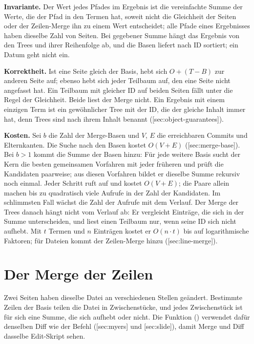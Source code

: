 {\bf Invariante.} Der Wert jedes Pfades im Ergebnis ist die vereinfachte Summe der Werte, die der
Pfad in den Termen hat, soweit nicht die Gleichheit der Seiten oder der Zeilen-Merge ihn zu
einem Wert entscheidet; alle Pfade eines Ergebnisses haben dieselbe Zahl von Seiten.
Bei gegebener Summe hängt das Ergebnis von den Trees und ihrer Reihenfolge ab, und die Basen
liefert  nach ID sortiert; ein Datum geht nicht ein.

{\bf Korrektheit.} Ist eine Seite gleich der Basis, hebt sich $O + (T - B)$ zur anderen Seite auf;
ebenso hebt sich jeder Teilbaum auf, den eine Seite nicht angefasst hat.
Ein Teilbaum mit gleicher ID auf beiden Seiten fällt unter die Regel der Gleichheit.
Beide liest der Merge nicht.
Ein Ergebnis mit einem einzigen Term ist ein gewöhnlicher Tree mit der ID, die der gleiche
Inhalt immer hat, denn Trees sind nach ihrem Inhalt benannt ([sec:object-guarantees]).

{\bf Kosten.} Sei $b$ die Zahl der Merge-Basen und $V$, $E$ die erreichbaren Commits und
Elternkanten.
Die Suche nach den Basen kostet $O(V+E)$ ([sec:merge-base]).
Bei $b > 1$ kommt die Summe der Basen hinzu: Für jede weitere Basis sucht der Kern die besten
gemeinsamen Vorfahren mit jeder früheren und prüft die Kandidaten paarweise;
aus diesen Vorfahren bildet er dieselbe Summe rekursiv noch einmal.
Jeder Schritt ruft  auf und kostet $O(V+E)$; die Paare allein machen bis zu
quadratisch viele Aufrufe in der Zahl der Kandidaten.
Im schlimmsten Fall wächst die Zahl der Aufrufe mit dem Verlauf.
Der Merge der Trees danach hängt nicht vom Verlauf ab: Er vergleicht Einträge, die sich in der
Summe unterscheiden, und liest einen Teilbaum nur, wenn seine ID sich nicht aufhebt.
Mit $t$ Termen und $n$ Einträgen kostet er $O(n \cdot t)$ bis auf logarithmische Faktoren;
für Dateien kommt der Zeilen-Merge hinzu ([sec:line-merge]).

\section[sec:line-merge]{Der Merge der Zeilen}

Zwei Seiten haben dieselbe Datei an verschiedenen Stellen geändert.
Bestimmte Zeilen der Basis teilen die Datei in Zwischenstücke,
und jedes Zwischenstück ist für sich
eine Summe, die sich aufhebt oder nicht.
Die Funktion () verwendet dafür denselben Diff wie der Befehl 
([sec:myers] und [sec:slide]),
damit Merge und Diff dasselbe Edit-Skript sehen.

